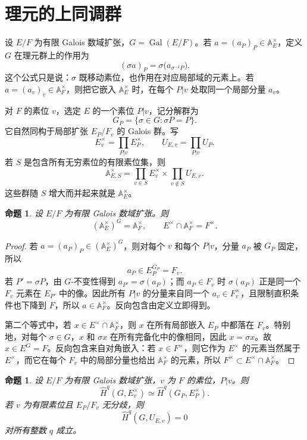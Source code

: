 \documentclass[11pt,a4paper,openany]{ctexbook}
\numberwithin{equation}{chapter}
\newcommand{\A}{\mathbb{A}}
\newcommand{\Gal}{\operatorname{Gal}}
\theoremstyle{plain}
\newtheorem{proposition}[theorem]{命题}
\theoremstyle{definition}
\theoremstyle{remark}
\begin{document}
\section{理元的上同调群}

设 $E/F$ 为有限 Galois 数域扩张，$G=\Gal(E/F)$。若 $a=(a_P)_P\in\A_E^\times$，定义 $G$ 在理元群上的作用为
\[
(\sigma a)_P=\sigma\bigl(a_{\sigma^{-1}P}\bigr).
\]
这个公式只是说：$\sigma$ 既移动素位，也作用在对应局部域的元素上。若 $a=(a_v)_v\in\A_F^\times$，则把它嵌入 $\A_E^\times$ 时，在每个 $P|v$ 处取同一个局部分量 $a_v$。

对 $F$ 的素位 $v$，选定 $E$ 的一个素位 $P|v$，记分解群为
\[
G_P=\{\sigma\in G:\sigma P=P\}.
\]
它自然同构于局部扩张 $E_P/F_v$ 的 Galois 群。写
\[
E_v^\times=\prod_{P|v}E_P^\times,\qquad U_{E,v}=\prod_{P|v}U_P.
\]
若 $S$ 是包含所有无穷素位的有限素位集，则
\[
\A_{E,S}^\times=\prod_{v\in S}E_v^\times\times\prod_{v\notin S}U_{E,v}.
\]
这些群随 $S$ 增大而并起来就是 $\A_E^\times$。

\begin{proposition}
设 $E/F$ 为有限 Galois 数域扩张。则
\[
(\A_E^\times)^G=\A_F^\times,\qquad E^\times\cap \A_F^\times=F^\times.
\]
\end{proposition}

\begin{proof}
若 $a=(a_P)_P\in(\A_E^\times)^G$，则对每个 $v$ 和每个 $P|v$，分量 $a_P$ 被 $G_P$ 固定，所以
\[
a_P\in E_P^{G_P}=F_v.
\]
若 $P'=\sigma P$，由 $G$-不变性得到 $a_{P'}=\sigma(a_P)$；而 $a_P\in F_v$ 时 $\sigma(a_P)$ 正是同一个 $F_v$ 元素在 $E_{P'}$ 中的像。因此所有 $P|v$ 的分量来自同一个 $a_v\in F_v^\times$，且限制直积条件也下降到 $F$，所以 $a\in\A_F^\times$。反向包含由定义立即得到。

第二个等式中，若 $x\in E^\times\cap\A_F^\times$，则 $x$ 在所有局部嵌入 $E_P$ 中都落在 $F_v$。特别地，对每个 $\sigma\in G$，$x$ 和 $\sigma x$ 在所有完备化中的像相同，因此 $x=\sigma x$。故 $x\in E^G=F$。反向包含来自对角嵌入：若 $x\in F^\times$，则它作为 $E^\times$ 的元素当然属于 $E^\times$，而它在每个 $F_v$ 中的局部分量也给出 $\A_F^\times$ 的元素，所以 $F^\times\subset E^\times\cap\A_F^\times$。
\end{proof}

\begin{proposition}
设 $E/F$ 为有限 Galois 数域扩张，$v$ 为 $F$ 的素位，$P|v$。则
\[
\widehat H^q(G,E_v^\times)\simeq \widehat H^q(G_P,E_P^\times).
\]
若 $v$ 为有限素位且 $E_P/F_v$ 无分歧，则
\[
\widehat H^q(G,U_{E,v})=0
\]
对所有整数 $q$ 成立。
\end{proposition}
\end{document}
